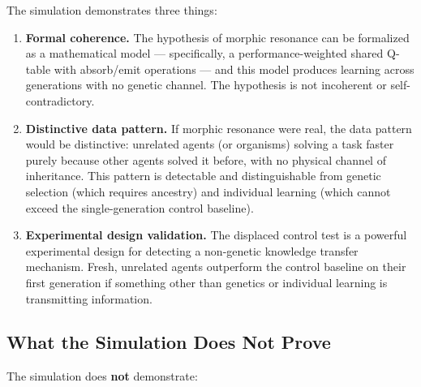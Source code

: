 \documentclass[twoside,11pt]{article}
\begin{document}
The simulation demonstrates three things:

\begin{enumerate}[leftmargin=2em]
    \item \textbf{Formal coherence.}  The hypothesis of morphic resonance can
          be formalized as a mathematical model --- specifically, a
          performance-weighted shared Q-table with absorb/emit operations ---
          and this model produces learning across generations with no genetic
          channel.  The hypothesis is not incoherent or self-contradictory.

    \item \textbf{Distinctive data pattern.}  If morphic resonance were real,
          the data pattern would be distinctive: unrelated agents (or
          organisms) solving a task faster purely because other agents solved
          it before, with no physical channel of inheritance.  This pattern is
          detectable and distinguishable from genetic selection (which requires
          ancestry) and individual learning (which cannot exceed the
          single-generation control baseline).

    \item \textbf{Experimental design validation.}  The displaced control test
          is a powerful experimental design for detecting a non-genetic
          knowledge transfer mechanism.  Fresh, unrelated agents outperform
          the control baseline on their first generation if something other
          than genetics or individual learning is transmitting information.
\end{enumerate}

\subsection{What the Simulation Does Not Prove}
\label{sec:epistemology:does_not_prove}

The simulation does \textbf{not} demonstrate:
\end{document}
